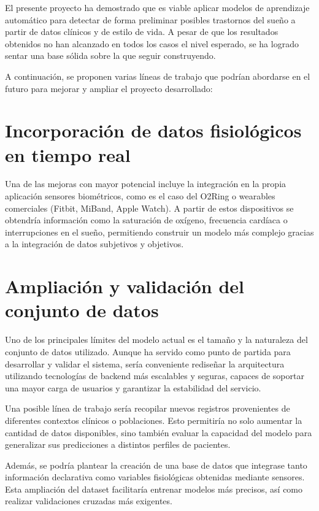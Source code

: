 
El presente proyecto ha demostrado que es viable aplicar modelos de aprendizaje automático para detectar de forma preliminar posibles trastornos del sueño a partir de datos clínicos y de estilo de vida. A pesar de que los resultados obtenidos no han alcanzado en todos los casos el nivel esperado, se ha logrado sentar una base sólida sobre la que seguir construyendo. 

A continuación, se proponen varias líneas de trabajo que podrían abordarse en el futuro para mejorar y ampliar el proyecto desarrollado:

\section{Incorporación de datos fisiológicos en tiempo real}
Una de las mejoras con mayor potencial incluye la integración en la propia aplicación sensores biométricos, como es el caso del O2Ring o wearables comerciales (Fitbit, MiBand, Apple Watch). A partir de estos dispositivos se obtendría información como la saturación de oxígeno, frecuencia cardíaca o interrupciones en el sueño, permitiendo construir un modelo más complejo gracias a la integración de datos subjetivos y objetivos.

\section{Ampliación y validación del conjunto de datos}
Uno de los principales límites del modelo actual es el tamaño y la naturaleza del conjunto de datos utilizado. Aunque ha servido como punto de partida para desarrollar y validar el sistema, sería conveniente rediseñar la arquitectura utilizando tecnologías de backend más escalables y seguras, capaces de soportar una mayor carga de usuarios y garantizar la estabilidad del servicio.

Una posible línea de trabajo sería recopilar nuevos registros provenientes de diferentes contextos clínicos o poblaciones. Esto permitiría no solo aumentar la cantidad de datos disponibles, sino también evaluar la capacidad del modelo para generalizar sus predicciones a distintos perfiles de pacientes.

Además, se podría plantear la creación de una base de datos que integrase tanto información declarativa como variables fisiológicas obtenidas mediante sensores. Esta ampliación del dataset facilitaría entrenar modelos más precisos, así como realizar validaciones cruzadas más exigentes.

